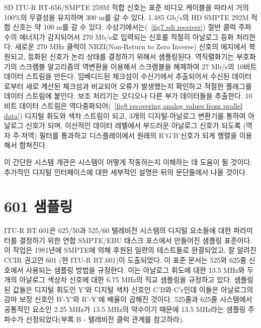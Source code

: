 SD ITU-R BT-656/SMPTE 259M 적합 신호는 표준 비디오 케이블을 따라서 거의 100\%의 무결성을 유지하며 300 m를 갈 수 있다. 1.485 Gb/s의 HD SMPTE 292M 적합 신호는 약 100 m를 갈 수 있다.
수상기에서는(\figurename~\ref{fig7 sdi receiver}) 절반 클럭 주파수의 에너지가 감지되어서 270 Mb/s로 입력되는 신호를 적절히 아날로그 등화 처리한다. 새로운 270 MHz 클럭이 NRZI(Non-Return to Zero Inverse) 신호의 에지에서 복원되고, 등화된 신호가 논리 상태를 결정하기 위해서 샘플링된다.
역직렬화기는 부호화기의 스크램블 알고리즘의 역변환을 이용해서 스크램블을 해제하여 27 Mb/s의 10비트 데이터 스트림을 만든다. 임베디드된 체크섬이 수신기에서 추출되어서 수신된 데이터로부터 새로 계산된 체크섬과 비교되어 오류가 발생했는지 확인하고 적절한 플래그를 데이터 스트림에 붙인다.
보조 처리기는 오디오나 다른 부가 데이터들을 추출한다.
10비트 데이터 스트림은 역다중화되어(\figurename~\ref{fig8 recovering analog values from prallel data}) 디지털 휘도와 색차 스트림이 되고, 3개의 디지털-아날로그 변환기를 통하여 아날로그 신호가 되며, 이산적인 데이터 레벨에서 부드러운 아날로그 신호가 되도록 (역자 주:저역) 필터를 통과하고 디스플레이에서 원래의 R'G'B'신호가 되게 행렬을 이용해서 합쳐진다.


이 간단한 시스템 개관은 시스템이 어떻게 작동하는지 이해하는 데 도움이 될 것이다. 추가적인 디지털 인터페이스에 대한 세부적인 설명은 뒤의 문단들에서 나올 것이다.

\section{601 샘플링}
ITU-R BT.601은 625/50과 525/60 텔레비전 시스템의 디지털 요소들에 대한 파라미터를 결정하기 위한 연합 SMPTE/EBU 태스크 포스에서 만들어진 샘플링 표준이다.
이 작업은 1981년에 SMPTE에 의해 후원된 일련의 테스트들로 완결되었고, 잘 알려진 CCIR 권고안 601 (현 ITU-R BT.601)이 도출되었다.
이 표준 문서는 525와 625줄 신호에서 사용되는 샘플링 방법을 규정한다. 이는 아날로그 휘도에 대한 13.5 MHz와 두 개의 아날로그 색상차 신호에 대한 6.75 MHz의 직교 샘플링을 규정하고 있다.
샘플링된 값들은 디지털 휘도인 Y'와 디지털 색차 신호인 C'B와 C'r인데 이들은 아날로그의 감마 보정 신호인 B'-Y'와 R'-Y'에 배율이 곱해진 것이다.
525줄과 625줄 시스템에서 공통적인 요소인 2.25 MHz가 13.5 MHz의 약수이기 때문에 13.5 MHz라는 샘플링 주파수가 선정되었다(부록 B - 텔레비전 클럭 관계를 참고하라).



